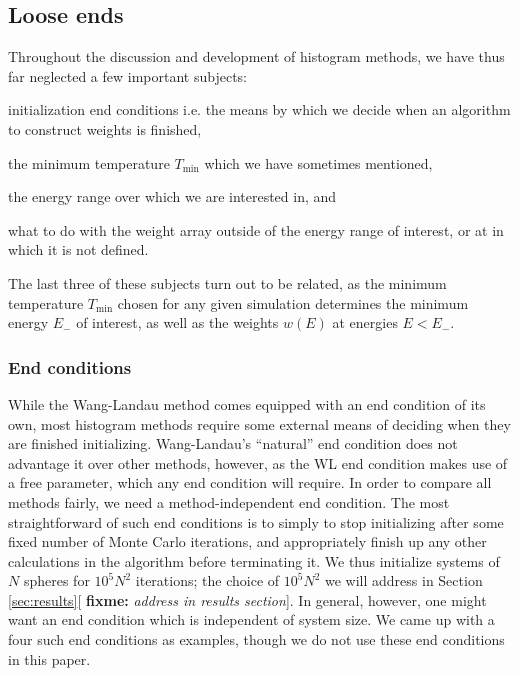 \documentclass[11pt]{article}
\renewcommand{\t}{\text} %
\newcommand{\p}[1]{\left(#1\right)} %
\newcommand{\red}[1]{{\bf \color{red} #1}}
\newcommand{\fixme}[1]{[\red{fixme:} \emph{#1}]}
\begin{document}
\subsection{Loose ends}
\label{sec:loose_ends}

Throughout the discussion and development of histogram methods, we
have thus far neglected a few important subjects:
\begin{enumerate*}
\item initialization end conditions i.e. the means by which we decide
  when an algorithm to construct weights is finished,
\item the minimum temperature $T_{\t{min}}$ which we have sometimes
  mentioned,
\item the energy range over which we are interested in, and
\item what to do with the weight array outside of the energy range of
  interest, or at in which it is not defined.
\end{enumerate*}
The last three of these subjects turn out to be related, as the
minimum temperature $T_{\t{min}}$ chosen for any given simulation
determines the minimum energy $E_-$ of interest, as well as the
weights $w\p{E}$ at energies $E<E_-$.

\subsubsection{End conditions}
\label{sec:end_conditions}

While the Wang-Landau method comes equipped with an end condition of
its own, most histogram methods require some external means of
deciding when they are finished initializing. Wang-Landau's
``natural'' end condition does not advantage it over other methods,
however, as the WL end condition makes use of a free parameter, which
any end condition will require. In order to compare all methods
fairly, we need a method-independent end condition. The most
straightforward of such end conditions is to simply to stop
initializing after some fixed number of Monte Carlo iterations, and
appropriately finish up any other calculations in the algorithm before
terminating it. We thus initialize systems of $N$ spheres for
$10^5N^2$ iterations; the choice of $10^5N^2$ we will address in
Section \ref{sec:results}\fixme{address in results section}. In
general, however, one might want an end condition which is independent
of system size. We came up with a four such end conditions as
examples, though we do not use these end conditions in this paper.
\end{document}

